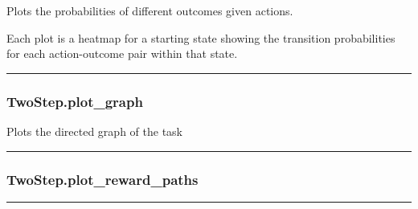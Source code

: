 Plots the probabilities of different outcomes given actions.

Each plot is a heatmap for a starting state showing the transition
probabilities for each action-outcome pair within that state.

\begin{center}\rule{0.5\linewidth}{\linethickness}\end{center}

\subsubsection{TwoStep.plot\_graph}\label{twostep.plot_graph}

\begin{Shaded}
\begin{Highlighting}[]
\OperatorTok{=}\OperatorTok{=}\OperatorTok{=}\OperatorTok{=}\OperatorTok{=}\OperatorTok{=}\OperatorTok{=}\OperatorTok{=}\NormalTok{)}
\end{Highlighting}
\end{Shaded}

Plots the directed graph of the task

\begin{center}\rule{0.5\linewidth}{\linethickness}\end{center}

\subsubsection{TwoStep.plot\_reward\_paths}\label{twostep.plot_reward_paths}

\begin{Shaded}
\begin{Highlighting}[]
\OperatorTok{=}\OperatorTok{=}\OperatorTok{=}\NormalTok{)}
\end{Highlighting}
\end{Shaded}

\begin{center}\rule{0.5\linewidth}{\linethickness}\end{center}

